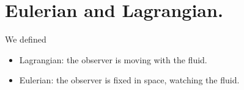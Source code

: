 \section{Eulerian and Lagrangian.}
%
We defined

\begin{itemize}
\item Lagrangian: the observer is moving with the fluid.
\item Eulerian: the observer is fixed in space, watching the fluid.
\end{itemize}

